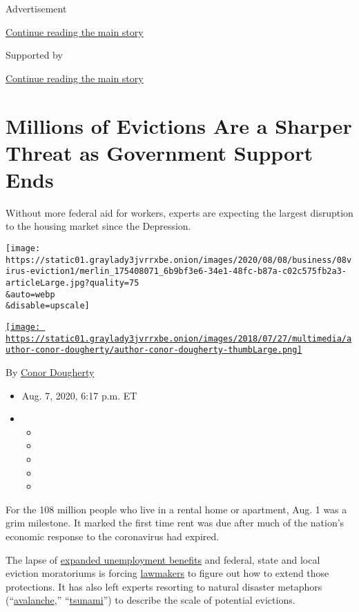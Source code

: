 Advertisement

\protect\hyperlink{after-top}{Continue reading the main story}

Supported by

\protect\hyperlink{after-sponsor}{Continue reading the main story}

\hypertarget{millions-of-evictions-are-a-sharper-threat-as-government-support-ends}{%
\section{Millions of Evictions Are a Sharper Threat as Government
Support
Ends}\label{millions-of-evictions-are-a-sharper-threat-as-government-support-ends}}

Without more federal aid for workers, experts are expecting the largest
disruption to the housing market since the Depression.

\texttt{[image: https://static01.graylady3jvrrxbe.onion/images/2020/08/08/business/08virus-eviction1/merlin\_175408071\_6b9bf3e6-34e1-48fc-b87a-c02c575fb2a3-articleLarge.jpg?quality=75\\\&auto=webp\\\&disable=upscale]}

\href{https://www.nytimes3xbfgragh.onion/by/conor-dougherty}{\texttt{[image: https://static01.graylady3jvrrxbe.onion/images/2018/07/27/multimedia/author-conor-dougherty/author-conor-dougherty-thumbLarge.png]}}

By \href{https://www.nytimes3xbfgragh.onion/by/conor-dougherty}{Conor
Dougherty}

\begin{itemize}
\item
  Aug. 7, 2020, 6:17 p.m. ET
\item
  \begin{itemize}
  \item
  \item
  \item
  \item
  \item
  \end{itemize}
\end{itemize}

For the 108 million people who live in a rental home or apartment, Aug.
1 was a grim milestone. It marked the first time rent was due after much
of the nation's economic response to the coronavirus had expired.

The lapse of
\href{https://www.nytimes3xbfgragh.onion/2020/08/06/business/coronavirus-jobs-report-trump-congress-stimulus.html}{expanded
unemployment benefits} and federal, state and local eviction moratoriums
is forcing
\href{https://www.latimes.com/california/story/2020-08-05/california-legislative-leaders-judicial-council-delay-lifting-eviction-moratorium-coronavirus}{lawmakers}
to figure out how to extend those protections. It has also left experts
resorting to natural disaster metaphors
(``\href{https://www.nytimes3xbfgragh.onion/2020/05/27/us/coronavirus-evictions-renters.html}{avalanche},''
``\href{https://www.nbcnews.com/business/business-news/tsunami-evictions-coming-warn-housing-advocates-n1233965}{tsunami}'')
to describe the scale of potential evictions.

